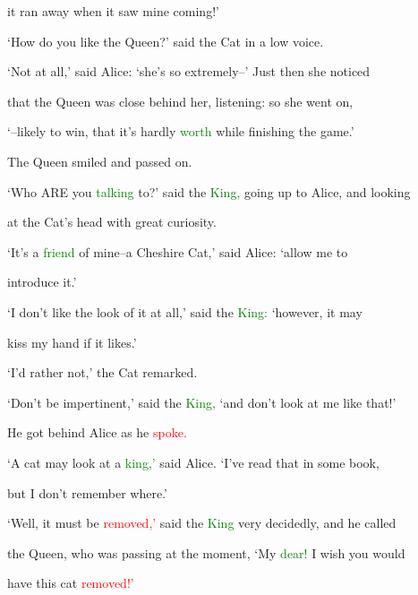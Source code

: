  it ran away when it saw mine coming!’



 ‘How do you like the Queen?’ said the Cat in a low voice.



 ‘Not at all,’ said Alice: ‘she’s so extremely--’ Just then she noticed

 that the Queen was close behind her, listening: so she went on,

 ‘--likely to win, that it’s hardly \textcolor{green}{worth} while finishing the game.’



 The Queen \textcolor{BurntOrange}{smiled} and passed on.



 ‘Who ARE you \textcolor{green}{talking} to?’ said the \textcolor{green}{King,} going up to Alice, and looking

 at the Cat’s head with great \textcolor{BurntOrange}{curiosity.}



 ‘It’s a \textcolor{green}{friend} of mine--a Cheshire Cat,’ said Alice: ‘allow me to

 introduce it.’



 ‘I don’t like the look of it at all,’ said the \textcolor{green}{King:} ‘however, it may

 \textcolor{BurntOrange}{kiss} my hand if it likes.’



 ‘I’d rather not,’ the Cat remarked.



 ‘Don’t be impertinent,’ said the \textcolor{green}{King,} ‘and don’t look at me like that!’

 He got behind Alice as he \textcolor{red}{spoke.}



 ‘A cat may look at a \textcolor{green}{king,’} said Alice. ‘I’ve read that in some book,

 but I don’t remember where.’



 ‘Well, it must be \textcolor{red}{removed,’} said the \textcolor{green}{King} very decidedly, and he called

 the Queen, who was passing at the moment, ‘My \textcolor{green}{dear!} I wish you would

 have this cat \textcolor{red}{removed!’}



